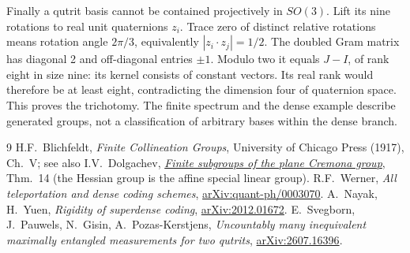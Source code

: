 \documentclass[10pt]{article}
\begin{document}
Finally a qutrit basis cannot be contained projectively in $SO(3)$. Lift its nine rotations to real unit quaternions $z_i$. Trace zero of distinct relative rotations means rotation angle $2\pi/3$, equivalently $|z_i\cdot z_j|=1/2$. The doubled Gram matrix has diagonal 2 and off-diagonal entries $\pm1$. Modulo two it equals $J-I$, of rank eight in size nine: its kernel consists of constant vectors. Its real rank would therefore be at least eight, contradicting the dimension four of quaternion space. This proves the trichotomy. The finite spectrum and the dense example describe generated groups, not a classification of arbitrary bases within the dense branch.

\begin{thebibliography}{9}\setlength{\itemsep}{0pt}
 H.F.~Blichfeldt, \emph{Finite Collineation Groups}, University of Chicago Press (1917), Ch.~V; see also I.V.~Dolgachev, \href{https://www.maths.ed.ac.uk/cheltsov/ed/pdf/asia.pdf}{\emph{Finite subgroups of the plane Cremona group}}, Thm.~14 (the Hessian group is the affine special linear group).
 R.F.~Werner, \emph{All teleportation and dense coding schemes}, \href{https://arxiv.org/abs/quant-ph/0003070}{arXiv:quant-ph/0003070}.
 A.~Nayak, H.~Yuen, \emph{Rigidity of superdense coding}, \href{https://arxiv.org/abs/2012.01672}{arXiv:2012.01672}.
 E.~Svegborn, J.~Pauwels, N.~Gisin, A.~Pozas-Kerstjens, \emph{Uncountably many inequivalent maximally entangled measurements for two qutrits}, \href{https://arxiv.org/abs/2607.16396}{arXiv:2607.16396}.
\end{thebibliography}
\end{document}
